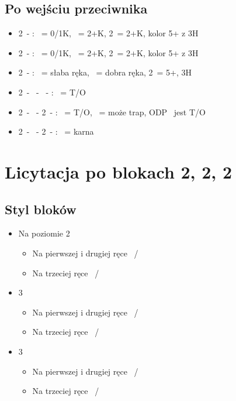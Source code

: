 \documentclass[12pt, a4paper]{article}
\begin{document}
\subsection{Po wejściu przeciwnika}
\begin{itemize}
    \item 2\clubs\ - \enemy{\dbl}: \rdbl\ = 0/1K, \pass\ = 2+K, 2\diams\hearts\spades\ = 2+K, kolor 5+ z 3H
    \item 2\clubs\ - \enemy{2\diams}: \dbl\ = 0/1K, \pass\ = 2+K, 2\hearts\spades\ = 2+K, kolor 5+ z 3H
    \item 2\clubs\ - \enemy{2\hearts+}: \dbl\ = słaba ręka, \pass\ = dobra ręka, 2\spades\ = 5+, 3H
    \item 2\clubs\ - \ - \pass\ - \enemy{\pass}: \dbl\ = T/O
    \item 2\clubs\ - \enemy{\pass}\ - 2\diams\ - : \dbl\ = T/O, \pass\ = może trap, ODP \dbl\ jest T/O 
    \item 2\clubs\ - \enemy{\pass}\ - 2\major\ - : \dbl\ = karna
\end{itemize}


\pagebreak
\section{Licytacja po blokach 2\diams, 2\hearts, 2\spades}
\subsection{Styl bloków}
\begin{itemize}
    \item Na poziomie 2
    \begin{itemize}
        \item Na pierwszej i drugiej ręce \ / 
        \item Na trzeciej ręce \ /  
    \end{itemize}
    
    \item 3\clubs\diams
    \begin{itemize}
        \item Na pierwszej i drugiej ręce \ / 
        \item Na trzeciej ręce \ /  
    \end{itemize}

    \item 3\hearts\spades
    \begin{itemize}
        \item Na pierwszej i drugiej ręce \ / 
        \item Na trzeciej ręce \ /  
    \end{itemize}
\end{itemize}
\end{document}
